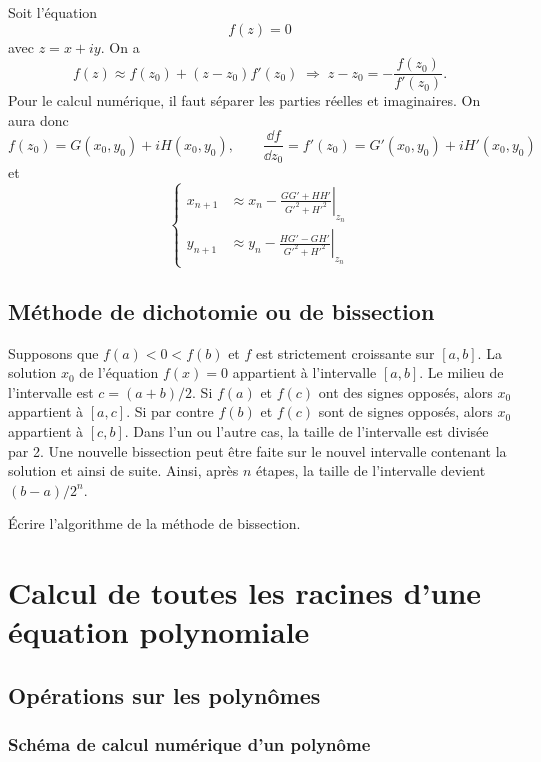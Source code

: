 Soit l'équation
\[
  f(z) = 0
\]
avec $z = x + iy$. On a
\[
  f(z) \approx f(z_0) + (z - z_0) f'(z_0)
  \;\Longrightarrow\; z - z_0 = -\frac{f(z_0)}{f'(z_0)} .
\]
Pour le calcul numérique, il faut séparer les parties réelles et imaginaires.
On aura donc
\[
  f(z_0) = G(x_0, y_0) + iH(x_0, y_0), \qquad
  \frac{\dd f}{\dd z_0} = f'(z_0) = G'(x_0, y_0) + iH'(x_0, y_0)
\]
et
\[
  \left\{
  \begin{aligned}
    x_{n+1} &\approx x_n - \left.\frac{GG' + HH'}{G'^2 + H'^2}\right|_{z_n}\\[0.4em]
    y_{n+1} &\approx y_n - \left.\frac{HG' - GH'}{G'^2 + H'^2}\right|_{z_n}
  \end{aligned}
  \right.
\]

\subsection{Méthode de dichotomie ou de bissection}

Supposons que $f(a) < 0 < f(b)$ et $f$ est strictement croissante sur $[a,b]$.
La solution $x_0$ de l'équation $f(x) = 0$ appartient à l'intervalle $[a,b]$.
Le milieu de l'intervalle est $c = (a+b)/2$. Si $f(a)$ et $f(c)$ ont des signes
opposés, alors $x_0$ appartient à $[a,c]$. Si par contre $f(b)$ et $f(c)$ sont
de signes opposés, alors $x_0$ appartient à $[c,b]$. Dans l'un ou l'autre
cas, la taille de l'intervalle est divisée par 2. Une nouvelle bissection peut
être faite sur le nouvel intervalle contenant la solution et ainsi de suite.
Ainsi, après $n$ étapes, la taille de l'intervalle devient $(b-a)/2^n$.

\begin{exercice}
Écrire l'algorithme de la méthode de bissection.
\end{exercice}

\section{Calcul de toutes les racines d'une équation polynomiale}

\subsection{Opérations sur les polynômes}

\subsubsection{Schéma de calcul numérique d'un polynôme}

